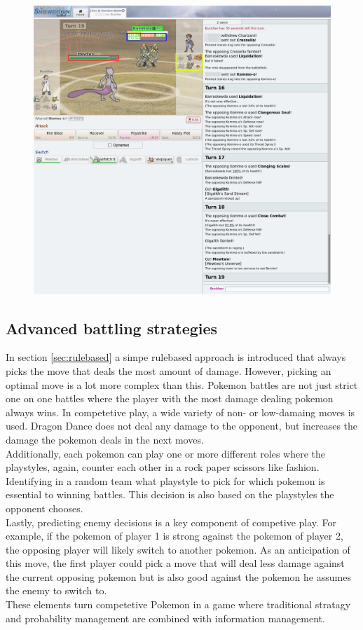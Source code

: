 \documentclass{article}
\begin{document}
\begin{figure}
  \centering
  \includegraphics[width=.9\linewidth]{images/Showdown.png}
  \label{fig:showdown-battle}
\end{figure}

\subsection{Advanced battling strategies}
In section \ref{sec:rulebased} a simpe rulebased approach is introduced that 
always picks the move that deals the most amount of damage. However, picking 
an optimal move is a lot more complex than this. Pokemon battles are not just
strict one on one battles where the player with the most damage dealing pokemon
always wins. In competetive play, a wide variety of non- or low-damaing moves
is used. Dragon Dance does not deal any damage to the opponent, but increases
the damage the pokemon deals in the next moves. \\
Additionally, each pokemon can play one or more different roles where the 
playstyles, again, counter each other in a rock paper scissors like fashion. 
Identifying in a random team what playstyle to pick for which pokemon is
essential to winning battles. This decision is also based on the playstyles
the opponent chooses. \\
Lastly, predicting enemy decisions is a key component of competive play. For 
example, if the pokemon of player 1 is strong against the pokemon of player 2,
the opposing player will likely switch to another pokemon. As an anticipation
of this move, the first player could pick a move that will deal less damage
against the current opposing pokemon but is also good against the pokemon
he assumes the enemy to switch to. \\
These elements turn competetive Pokemon in a game where traditional stratagy
and probability management are combined with information management.
\end{document}
